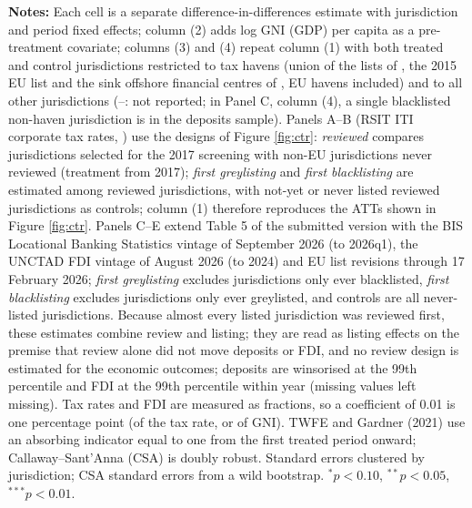 \begin{table}[p]
\begin{flushleft}
{\bf Notes:} Each cell is a separate difference-in-differences estimate with jurisdiction and period fixed effects; column (2) adds log GNI (GDP) per capita as a pre-treatment covariate; columns (3) and (4) repeat column (1) with both treated and control jurisdictions restricted to tax havens (union of the lists of , the 2015 EU list and the sink offshore financial centres of , EU havens included) and to all other jurisdictions (--: not reported; in Panel C, column (4), a single blacklisted non-haven jurisdiction is in the deposits sample). Panels A--B (RSIT ITI corporate tax rates, ) use the designs of Figure \ref{fig:ctr}: \emph{reviewed} compares jurisdictions selected for the 2017 screening with non-EU jurisdictions never reviewed (treatment from 2017); \emph{first greylisting} and \emph{first blacklisting} are estimated among reviewed jurisdictions, with not-yet or never listed reviewed jurisdictions as controls; column (1) therefore reproduces the ATTs shown in Figure \ref{fig:ctr}. Panels C--E extend Table 5 of the submitted version with the BIS Locational Banking Statistics vintage of September 2026 (to 2026q1), the UNCTAD FDI vintage of August 2026 (to 2024) and EU list revisions through 17 February 2026; \emph{first greylisting} excludes jurisdictions only ever blacklisted, \emph{first blacklisting} excludes jurisdictions only ever greylisted, and controls are all never-listed jurisdictions. Because almost every listed jurisdiction was reviewed first, these estimates combine review and listing; they are read as listing effects on the premise that review alone did not move deposits or FDI, and no review design is estimated for the economic outcomes; deposits are winsorised at the 99th percentile and FDI at the 99th percentile within year (missing values left missing). Tax rates and FDI are measured as fractions, so a coefficient of 0.01 is one percentage point (of the tax rate, or of GNI). TWFE and Gardner (2021) use an absorbing indicator equal to one from the first treated period onward; Callaway--Sant'Anna (CSA) is doubly robust.  Standard errors clustered by jurisdiction; CSA standard errors from a wild bootstrap. $^{*}p<0.10$, $^{**}p<0.05$, $^{***}p<0.01$.
\end{flushleft}
\end{table}
